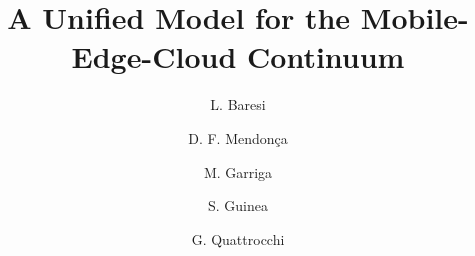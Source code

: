 \documentclass[format=acmsmall, review=false, screen=false]{acmart}
\begin{document}
	\title[A Unified Model for the Mobile-Edge-Cloud Continuum]{A Unified Model for the Mobile-Edge-Cloud Continuum}  
	
	\author{L. Baresi}
	\author{D. F. Mendon\c{c}a}
	\author{M. Garriga}
	\author{S. Guinea}
	\author{G. Quattrocchi}
	
	
	\begin{abstract}
		
	\end{abstract}
	
\end{document}
